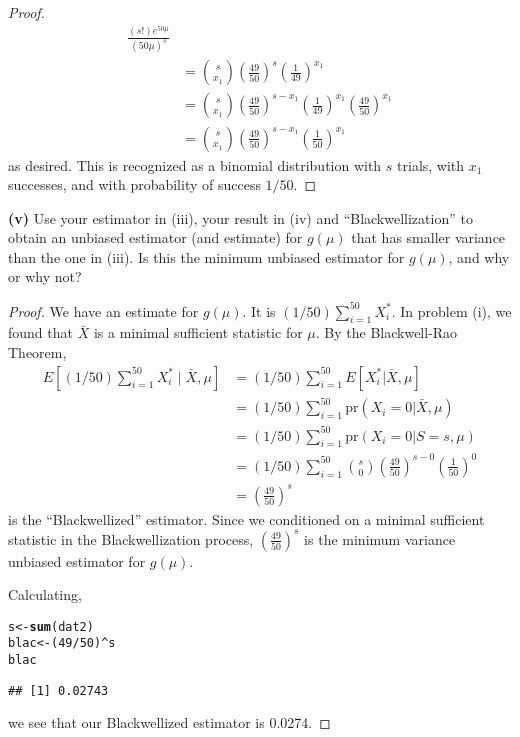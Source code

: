 \documentclass[letterpaper, 12pt]{article}\usepackage[]{graphicx}\usepackage[]{color}
\makeatletter
\newcommand{\hlnum}[1]{\textcolor[rgb]{0.686,0.059,0.569}{#1}}%
\newcommand{\hlopt}[1]{\textcolor[rgb]{0,0,0}{#1}}%
\newcommand{\hlstd}[1]{\textcolor[rgb]{0.345,0.345,0.345}{#1}}%
\newcommand{\hlkwb}[1]{\textcolor[rgb]{0.69,0.353,0.396}{#1}}%
\newcommand{\hlkwd}[1]{\textcolor[rgb]{0.737,0.353,0.396}{\textbf{#1}}}%
\newenvironment{kframe}{%
 \def\at@end@of@kframe{}%
 \ifinner\ifhmode%
  \def\at@end@of@kframe{\end{minipage}}%
  \begin{minipage}{\columnwidth}%
 \fi\fi%
 \def\FrameCommand##1{\hskip\@totalleftmargin \hskip-\fboxsep
 \colorbox{shadecolor}{##1}\hskip-\fboxsep
     \hskip-\linewidth \hskip-\@totalleftmargin \hskip\columnwidth}%
 \MakeFramed {\advance\hsize-\width
   \@totalleftmargin\z@ \linewidth\hsize
   \@setminipage}}%
 {\par\unskip\endMakeFramed%
 \at@end@of@kframe}
\newenvironment{knitrout}{}{} %
\newcommand{\pr}{\text{pr}}
\newcommand{\sbs}{\;|\;} %
\makeatother
\begin{document}
\begin{proof}
\begin{align*}
\frac{(s!)e^{50\mu}}{(50\mu)^{s}}  \\
&=
\binom{s}{x_1} 
\left(\frac{49}{50}\right)^s 
\left( \frac{1}{49} \right)^{x_1}
\\
&=
\binom{s}{x_1} 
\left(\frac{49}{50}\right)^{s -x_1}
\left( \frac{1}{49} \right)^{x_1}
\left( \frac{49}{50} \right)^{x_1}
\\
&=
\binom{s}{x_1} 
\left(\frac{49}{50}\right)^{s -x_1}
\left( \frac{1}{50} \right)^{x_1}
\end{align*}
as desired. This is recognized as a binomial distribution with $s$ trials, with $x_1$ successes, and with probability of success $1/50$.
\end{proof}

\textbf{(v)}
Use your estimator in (iii), your result in (iv) and ``Blackwellization'' to obtain an unbiased estimator (and estimate) for $g(\mu)$ that has smaller variance than the one in (iii). Is this the minimum unbiased estimator for $g(\mu)$, and why or why not? 

\begin{proof}
We have an estimate for $g(\mu)$. It is $(1/50)\sum_{i=1}^{50} X_i^*$. In problem (i), we found that $\bar{X}$ is a minimal sufficient statistic for $\mu$. By the Blackwell-Rao Theorem,
\begin{align*}
E\left[(1/50)\sum_{i=1}^{50} X_i^* \sbs \bar{X}, \mu \right] 
&= (1/50) \sum_{i=1}^{50} E[X_i^* | \bar{X}, \mu] \\
&= (1/50) \sum_{i=1}^{50} \pr(X_i = 0 | \bar{X}, \mu) \\
&= (1/50) \sum_{i=1}^{50} \pr(X_i = 0 | S=s, \mu) \\
&= (1/50) \sum_{i=1}^{50} 
\binom{s}{0} 
\left(\frac{49}{50}\right)^{s-0} 
\left( \frac{1}{50} \right)^{0}\\
&= \left(\frac{49}{50}\right)^s
\end{align*}
is the ``Blackwellized'' estimator. Since we conditioned on a minimal sufficient statistic in the Blackwellization process, $\left(\frac{49}{50}\right)^s$ is the minimum variance unbiased estimator for $g(\mu)$.

Calculating, 
\begin{knitrout}
\color{fgcolor}\begin{kframe}
\begin{alltt}
\hlstd{s} \hlkwb{<-} \hlkwd{sum}\hlstd{(dat2)}
\hlstd{blac} \hlkwb{<-} \hlstd{(}\hlnum{49}\hlopt{/}\hlnum{50}\hlstd{)}\hlopt{^}\hlstd{s}
\hlstd{blac}
\end{alltt}
\begin{verbatim}
## [1] 0.02743
\end{verbatim}
\end{kframe}
\end{knitrout}

we see that our Blackwellized estimator is 0.0274.
\end{proof}
\end{document}
